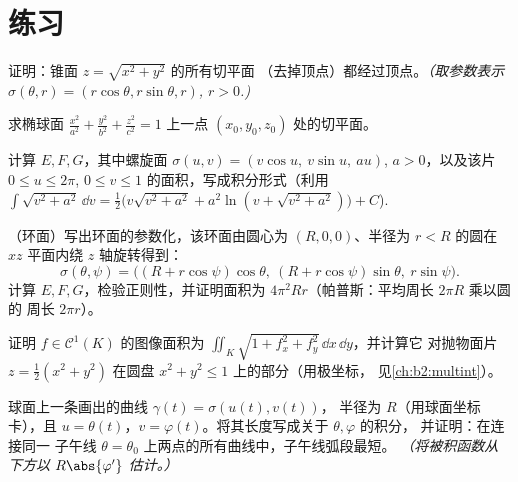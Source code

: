 \section{练习}

\begin{exercise}[$\star$]\label{exo:b2:surfaces:1}
证明：锥面 $z = \sqrt{x^2 + y^2}$ 的所有切平面
（去掉顶点）都经过顶点。\emph{（取参数表示
$\sigma(\theta, r) = (r\cos\theta, r\sin\theta, r)$, $r > 0$.)}
\end{exercise}

\begin{exercise}[$\star$]\label{exo:b2:surfaces:2}
求椭球面 $\frac{x^2}{a^2} +
\frac{y^2}{b^2} + \frac{z^2}{c^2} = 1$ 上一点 $(x_0, y_0,
z_0)$ 处的切平面。
\end{exercise}

\begin{exercise}[$\star$]\label{exo:b2:surfaces:3}
计算 $E, F, G$，其中螺旋面 $\sigma(u, v) = (v\cos u,\
v\sin u,\ au)$, $a > 0$，以及该片 $0 \leq u \leq
2\pi$, $0 \leq v \leq 1$ 的面积，写成积分形式（利用
$\int\sqrt{v^2 + a^2}\,\dd v = \frac12\bigl(v\sqrt{v^2+a^2} +
a^2\ln(v + \sqrt{v^2 + a^2})\bigr) + C$).
\end{exercise}

\begin{exercise}[$\star\star$]\label{exo:b2:surfaces:4}
（环面）写出环面的参数化，该环面由圆心为
$(R, 0, 0)$、半径为 $r < R$ 的圆在 $xz$ 平面内绕
$z$ 轴旋转得到：
\[
\sigma(\theta, \psi) = \bigl((R + r\cos\psi)\cos\theta,\
(R + r\cos\psi)\sin\theta,\ r\sin\psi\bigr).
\]
计算 $E, F, G$，检验正则性，并证明面积为
$4\pi^2 R r$（帕普斯：平均周长 $2\pi R$ 乘以圆的
周长 $2\pi r$）。
\end{exercise}

\begin{exercise}[$\star\star$]\label{exo:b2:surfaces:5}
证明 $f \in \mathcal{C}^1(K)$ 的图像面积为
$\iint_K \sqrt{1 + f_x^2 + f_y^2}\,\dd x\,\dd y$，并计算它
对抛物面片 $z = \frac12(x^2 + y^2)$ 在圆盘
$x^2 + y^2 \leq 1$ 上的部分（用极坐标，
见\cref{ch:b2:multint}）。
\end{exercise}

\begin{exercise}[$\star\star$]\label{exo:b2:surfaces:6}
球面上一条画出的曲线 $\gamma(t) = \sigma(u(t), v(t))$，
半径为 $R$（用球面坐标卡），且 $u = \theta(t)$，$v =
\varphi(t)$。将其长度写成关于 $\theta, \varphi$ 的积分，
并证明：在连接同一
子午线 $\theta = \theta_0$ 上两点的所有曲线中，子午线弧段最短。
\emph{（将被积函数从下方以 $R\abs{\varphi'}$ 估计。）}
\end{exercise}

